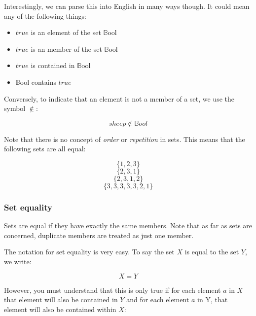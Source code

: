 Interestingly, we can parse this into English in many ways though. It could mean
any of the following things:

\begin{itemize}
	\item $true$ is an element of the set $\mathbb{B}$ool
	\item $true$ is an member of the set $\mathbb{B}$ool
	\item $true$ is contained in $\mathbb{B}$ool
	\item $\mathbb{B}$ool contains $true$
\end{itemize}

Conversely, to indicate that an element is not a member of a set, we use the
symbol $\notin$:

\begin{dmath}
	sheep \not\in \mathbb{B}ool
\end{dmath}

Note that there is no concept of {\it order} or {\it repetition} in sets. This
means that the following sets are all equal:

\begin{dmath}
	\{1,2,3\}
\end{dmath}
\begin{dmath}
	\{2,3,1\}
\end{dmath}
\begin{dmath}
	\{2,3,1,2\}
\end{dmath}
\begin{dmath}
	\{3,3,3,3,3,2,1\}
\end{dmath}

\subsubsection{Set equality}

Sets are equal if they have exactly the same members. Note that as far as sets
are concerned, duplicate members are treated as just one member.

The notation for set equality is very easy. To say the set $X$ is equal to the
set $Y$, we write:

\begin{dmath}
	X = Y
\end{dmath}

However, you must understand that this is only true if for each element $a$ in
$X$ that element will also be contained in $Y$ and for each element $a$ in Y,
that element will also be contained within $X$:

